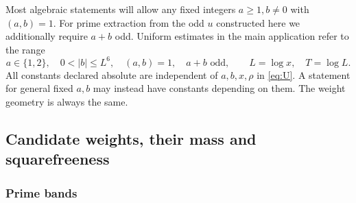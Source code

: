 \documentclass[11pt]{article}
\theoremstyle{definition}
\theoremstyle{definition}
\begin{document}
Most algebraic statements will allow any fixed integers \(a\ge1,b\ne0\) with \((a,b)=1\). For prime extraction from the odd \(u\) constructed here we additionally require \(a+b\) odd. Uniform estimates in the main application refer to the range
\begin{equation}
a\in\{1,2\},\quad 0<|b|\le L^6,\quad(a,b)=1,\quad a+b\text{ odd},
 \qquad L=\log x,\quad T=\log L.                         \tag{U}\label{eq:U}
\end{equation}
All constants declared absolute are independent of \(a,b,x,\rho\) in \eqref{eq:U}. A statement for general fixed \(a,b\) may instead have constants depending on them. The weight geometry is always the same.

\subsection{Candidate weights, their mass and squarefreeness}\label{sec:weights}

\subsubsection{Prime bands}\label{sec:bands}
\end{document}
